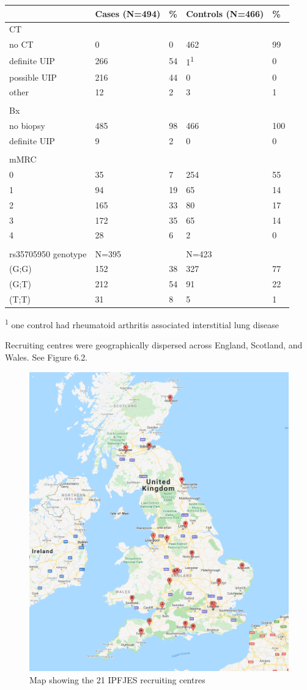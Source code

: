 \begin{longtable}[]{@{}lllll@{}}
\toprule
& Cases (N=494) & \% & Controls (N=466) & \%\tabularnewline
\midrule
\endhead
CT & & & &\tabularnewline
no CT & 0 & 0 & 462 & 99\tabularnewline
definite UIP & 266 & 54 & 1\textsuperscript{1} & 0\tabularnewline
possible UIP & 216 & 44 & 0 & 0\tabularnewline
other & 12 & 2 & 3 & 1\tabularnewline
& & & &\tabularnewline
Bx & & & &\tabularnewline
no biopsy & 485 & 98 & 466 & 100\tabularnewline
definite UIP & 9 & 2 & 0 & 0\tabularnewline
& & & &\tabularnewline
mMRC & & & &\tabularnewline
0 & 35 & 7 & 254 & 55\tabularnewline
1 & 94 & 19 & 65 & 14\tabularnewline
2 & 165 & 33 & 80 & 17\tabularnewline
3 & 172 & 35 & 65 & 14\tabularnewline
4 & 28 & 6 & 2 & 0\tabularnewline
& & & &\tabularnewline
rs35705950 genotype & N=395 & & N=423 &\tabularnewline
(G;G) & 152 & 38 & 327 & 77\tabularnewline
(G;T) & 212 & 54 & 91 & 22\tabularnewline
(T;T) & 31 & 8 & 5 & 1\tabularnewline
\bottomrule
\end{longtable}

\textsuperscript{1} one control had rheumatoid arthritis associated
interstitial lung disease

Recruiting centres were geographically dispersed across England,
Scotland, and Wales. See Figure 6.2.

\begin{figure}
\centering
\includegraphics{source/figures/ipfjes_centres.png}
\caption{Map showing the 21 IPFJES recruiting centres
\label{ipfjescentres}}
\end{figure}

